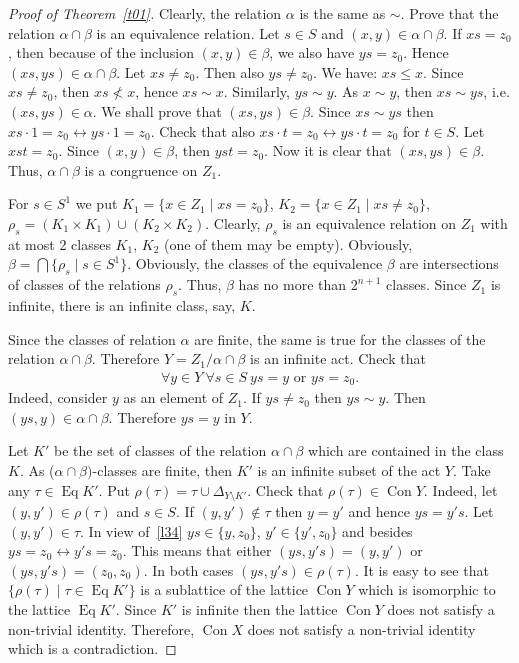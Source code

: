 \documentclass{birkau}
\numberwithin{equation}{section}
\theoremstyle{plain}
\theoremstyle{definition}
\DeclareMathOperator{\Con}{Con}
\DeclareMathOperator{\Eq}{Eq}
\begin{document}
\begin{proof}[Proof of Theorem~\ref{t01}]
		Clearly, the relation $\alpha$ is the same as $\sim$. Prove that the relation $\alpha \cap \beta$ is an equivalence relation. Let $s \in S$ and $(x,y) \in \alpha \cap \beta$. If $xs = z_0$, then because of the inclusion $(x,y) \in \beta$, we also have $ys = z_0$. Hence $(xs,ys) \in \alpha \cap \beta$. Let $xs \neq z_0$. Then also $ ys \neq z_0 $. We have: $xs \leqslant x$. Since $xs \neq z_0$, then $xs \not < x$, hence $xs \sim x$. Similarly, $ys \sim y$. As $x \sim y$, then $ xs \sim ys$, i.e. $(xs,ys) \in \alpha$. We shall prove that $(xs,ys) \in \beta$. Since $xs \sim ys$ then $xs \cdot 1 = z_0 \leftrightarrow ys \cdot 1 = z_0$. Check that also $xs \cdot t = z_0 \leftrightarrow ys \cdot t = z_0$ for $t \in S$. Let $xst = z_0$. Since $(x,y) \in \beta$, then $yst = z_0$. Now it is clear that $(xs,ys) \in \beta$. Thus, $\alpha \cap \beta$ is a congruence on $Z_1$.
		
		For $s \in S^1$ we put $ K_1 = \{ x \in Z_1 \mid xs = z_0 \} $, $ K_2 = \{ x \in Z_1 \mid xs \neq z_0 \}$, $\rho_s = (K_1 \times K_1) \cup (K_2 \times K_2)$. Clearly, $\rho_s$ is an equivalence relation on $Z_1$ with at most 2 classes $K_1$, $K_2$ (one of them may be empty). Obviously, $\beta = \bigcap \{\rho_s \mid s \in S^1\}$. Obviously, the classes of the equivalence $\beta$ are intersections of classes of the relations $\rho_s$. Thus, $\beta$ has no more than $2^{n+1}$ classes. Since $Z_1$ is infinite, there is an infinite class, say, $K$.
		
		Since the classes of relation $\alpha$ are finite, the same is true for the classes of the relation $\alpha \cap \beta$. Therefore $Y = {Z_1}/{\alpha \cap \beta}$ is an infinite act. Check that
		\begin{gather}
		    \forall y \in Y \ \forall s \in S \ ys = y \text{ or } ys = z_0. \label{l34}
		\end{gather}
		Indeed, consider $y$ as an element of $Z_1$. If $ys \neq z_0$ then $ys \sim y$. Then $(ys,y) \in \alpha \cap \beta$. Therefore $ys = y$ in $Y$.
		
		Let $K'$ be the set of classes of the relation $\alpha \cap \beta$ which are contained in the class $K$. As ($\alpha \cap \beta)$-classes are finite, then $K'$ is an infinite subset of the act $Y$. Take any $\tau \in \Eq K'$. Put $\rho(\tau) = \tau \cup \Delta_{Y \setminus K'}$. Check that $\rho(\tau) \in \Con Y$. Indeed, let $(y,y') \in \rho(\tau)$ and $s \in S$. If $(y,y') \notin \tau$ then $y = y'$ and hence $ys = y's$. Let $(y,y') \in \tau$. In view of~\eqref{l34} $ys \in \{y,z_0\}$, $y' \in \{ y',z_0 \}$ and besides $ys = z_0 \leftrightarrow y's = z_0$. This means that either $(ys,y's) = (y,y')$ or $(ys,y's) = (z_0,z_0)$. In both cases $(ys,y's) \in \rho(\tau)$. It is easy to see that $\{\rho(\tau) \mid \tau \in \Eq K' \} $ is a sublattice of the lattice $\Con Y$ which is isomorphic to the lattice $\Eq K'$. Since $K'$ is infinite then the lattice $\Con Y$ does not satisfy a non-trivial identity. Therefore, $\Con X$ does not satisfy a non-trivial identity which is a contradiction.
		

\end{proof}
\end{document}
